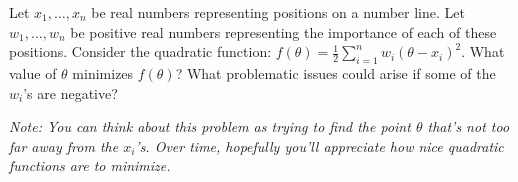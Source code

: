 \item {}

Let $x_1, \dots, x_n$ be real numbers representing positions on a number line.
Let $w_1, \dots, w_n$ be positive real numbers representing the importance of
each of these positions. Consider the quadratic function:
$f(\theta) = \frac{1}{2} \sum_{i=1}^n w_i (\theta - x_i)^2$.
What value of $\theta$ minimizes $f(\theta)$? What problematic issues could
arise if some of the $w_i$'s are negative?

{\em Note: You can think about this problem as trying to find the point $\theta$
that's not too far away from the $x_i$'s. Over time, hopefully you'll appreciate
how nice quadratic functions are to minimize.}
